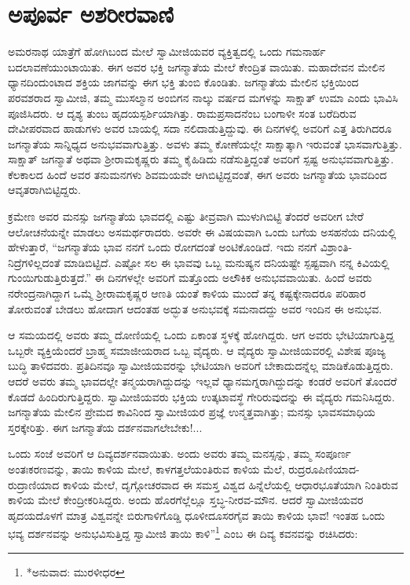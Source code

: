 
\chapter{ಅಪೂರ್ವ ಅಶರೀರವಾಣಿ}

\noindent

ಅಮರನಾಥ ಯಾತ್ರೆಗೆ ಹೋಗಿಬಂದ ಮೇಲೆ ಸ್ವಾಮೀಜಿಯವರ ವ್ಯಕ್ತಿತ್ವದಲ್ಲಿ ಒಂದು ಗಮನಾರ್ಹ ಬದಲಾವಣೆಯುಂಟಾಯಿತು. ಈಗ ಅವರ ಭಕ್ತಿ ಜಗನ್ಮಾತೆಯ ಮೇಲೆ ಕೇಂದ್ರಿತ ವಾಯಿತು. ಮಹಾದೇವನ ಮೇಲಿನ ಧ್ಯಾನದಿಂದುಂಟಾದ ಶಕ್ತಿಯ ಜಾಗವನ್ನು ಈಗ ಭಕ್ತಿ ತುಂಬಿ ಕೊಂಡಿತು. ಜಗನ್ಮಾತೆಯ ಮೇಲಿನ ಭಕ್ತಿಯಿಂದ ಪರವಶರಾದ ಸ್ವಾಮೀಜಿ, ತಮ್ಮ ಮುಸಲ್ಮಾನ ಅಂಬಿಗನ ನಾಲ್ಕು ವರ್ಷದ ಮಗಳನ್ನು ಸಾಕ್ಷಾತ್ ಉಮಾ ಎಂದು ಭಾವಿಸಿ ಪೂಜಿಸಿದರು. ಆ ದೃಶ್ಯ ತುಂಬ ಹೃದಯಸ್ಪರ್ಶಿಯಾಗಿತ್ತು. ರಾಮಪ್ರಸಾದನೆಂಬ ಬಂಗಾಳೀ ಸಂತ ಬರೆದಿರುವ ದೇವೀಪರವಾದ ಹಾಡುಗಳು ಅವರ ಬಾಯಲ್ಲಿ ಸದಾ ನಲಿದಾಡುತ್ತಿದ್ದುವು. ಈ ದಿನಗಳಲ್ಲಿ ಅವರಿಗೆ ಎತ್ತ ತಿರುಗಿದರೂ ಜಗನ್ಮಾತೆಯ ಸಾನ್ನಿಧ್ಯದ ಅನುಭವವಾಗುತ್ತಿತ್ತು. ಅವಳು ತಮ್ಮ ಕೋಣೆಯಲ್ಲೇ ಸಾಕ್ಷಾತ್ಕಾಗಿ ಇರುವಂತೆ ಭಾಸವಾಗುತ್ತಿತ್ತು. ಸಾಕ್ಷಾತ್ ಜಗನ್ಮಾತೆ ಅಥವಾ ಶ್ರೀರಾಮಕೃಷ್ಣರು ತಮ್ಮ ಕೈಹಿಡಿದು ನಡೆಸುತ್ತಿದ್ದಂತೆ ಅವರಿಗೆ ಸ್ಪಷ್ಟ ಅನುಭವವಾಗುತ್ತಿತ್ತು. ಕೆಲಕಾಲದ ಹಿಂದೆ ಅವರ ತನುಮನಗಳು ಶಿವಮಯವೇ ಆಗಿಬಿಟ್ಟಿದ್ದವಂತೆ, ಈಗ ಅವರು ಜಗನ್ಮಾತೆಯ ಭಾವದಿಂದ ಆವೃತರಾಗಿಬಿಟ್ಟಿದ್ದರು.

ಕ್ರಮೇಣ ಅವರ ಮನಸ್ಸು ಜಗನ್ಮಾತೆಯ ಭಾವದಲ್ಲಿ ಎಷ್ಟು ತೀವ್ರವಾಗಿ ಮುಳುಗಿಬಿಟ್ಟಿ ತೆಂದರೆ ಅವರೀಗ ಬೇರೆ ಆಲೋಚನೆಯನ್ನೇ ಮಾಡಲು ಅಸಮರ್ಥರಾದರು. ಅವರೇ ಈ ವಿಷಯವಾಗಿ ಒಂದು ಬಗೆಯ ಅಸಹನೆಯ ದನಿಯಲ್ಲಿ ಹೇಳುತ್ತಾರೆ, “ಜಗನ್ಮಾತೆಯ ಭಾವ ನನಗೆ ಒಂದು ರೋಗದಂತೆ ಅಂಟಿಕೊಂಡಿದೆ. ಇದು ನನಗೆ ವಿಶ್ರಾಂತಿ-ನಿದ್ರೆಗಳಿಲ್ಲದಂತೆ ಮಾಡಿಬಿಟ್ಟಿದೆ. ಎಷ್ಟೋ ಸಲ ಈ ಭಾವವು ಒಬ್ಬ ಮನುಷ್ಯನ ದನಿಯಷ್ಟೇ ಸ್ಪಷ್ಟವಾಗಿ ನನ್ನ ಕಿವಿಯಲ್ಲಿ ಗುಂಯಿಗುಡುತ್ತಿರುತ್ತದೆ.” ಈ ದಿನಗಳಲ್ಲೇ ಅವರಿಗೆ ಮತ್ತೊಂದು ಅಲೌಕಿಕ ಅನುಭವವಾಯಿತು. ಹಿಂದೆ ಅವರು ನರೇಂದ್ರನಾಗಿದ್ದಾಗ ಒಮ್ಮೆ ಶ್ರೀರಾಮಕೃಷ್ಣರ ಆಣತಿ ಯಂತೆ ಕಾಳಿಯ ಮುಂದೆ ತನ್ನ ಕಷ್ಟಕ್ಕೇನಾದರೂ ಪರಿಹಾರ ತೋರುವಂತೆ ಬೇಡಲು ಹೋದಾಗ ಆದಂತಹ ಅದ್ಭುತ ಅನುಭವಕ್ಕೆ ಸಮನಾದದ್ದು ಅವರ ಇಂದಿನ ಈ ಅನುಭವ.

ಆ ಸಮಯದಲ್ಲಿ ಅವರು ತಮ್ಮ ದೋಣಿಯಲ್ಲಿ ಒಂದು ಏಕಾಂತ ಸ್ಥಳಕ್ಕೆ ಹೋಗಿದ್ದರು. ಆಗ ಅವರು ಭೇಟಿಯಾಗುತ್ತಿದ್ದ ಒಬ್ಬರೇ ವ್ಯಕ್ತಿಯೆಂದರೆ ಬ್ರಾಹ್ಮ ಸಮಾಜೀಯರಾದ ಒಬ್ಬ ವೈದ್ಯರು. ಆ ವೈದ್ಯರು ಸ್ವಾಮೀಜಿಯವರಲ್ಲಿ ವಿಶೇಷ ಪೂಜ್ಯ ಬುದ್ಧಿ ತಾಳಿದವರು. ಪ್ರತಿದಿನವೂ ಸ್ವಾಮೀಜಿಯವರನ್ನು ಭೇಟಿಯಾಗಿ ಅವರಿಗೆ ಬೇಕಾದುದನ್ನೆಲ್ಲ ಮಾಡಿಕೊಡುತ್ತಿದ್ದರು. ಆದರೆ ಅವರು ತಮ್ಮ ಭಾವದಲ್ಲೇ ತನ್ಮಯರಾಗಿದ್ದುದನ್ನು ಇಲ್ಲವೆ ಧ್ಯಾನಮಗ್ನರಾಗಿದ್ದುದನ್ನು ಕಂಡರೆ ಅವರಿಗೆ ತೊಂದರೆ ಕೊಡದೆ ಹಿಂದಿರುಗುತ್ತಿದ್ದರು. ಸ್ವಾಮೀಜಿಯವರು ಭಕ್ತಿಯ ಉತ್ಕಟಾವಸ್ಥೆ ಗೇರಿರುವುದನ್ನು ಈ ವೈದ್ಯರು ಗಮನಿಸಿದ್ದರು. ಜಗನ್ಮಾತೆಯ ಮೇಲಿನ ಪ್ರೇಮದ ಕಾವಿನಿಂದ ಸ್ವಾಮೀಜಿಯರ ಪ್ರಜ್ಞೆ ಉನ್ಮತ್ತವಾಗಿತ್ತು; ಮನಸ್ಸು ಭಾವಸಮಾಧಿಯ ಸ್ತರಕ್ಕೇರಿತ್ತು. ಈಗ ಜಗನ್ಮಾತೆಯ ದರ್ಶನವಾಗಲೇಬೇಕು!... 

ಒಂದು ಸಂಜೆ ಅವರಿಗೆ ಆ ದಿವ್ಯದರ್ಶನವಾಯಿತು. ಅಂದು ಅವರು ತಮ್ಮ ಮನಸ್ಸನ್ನು, ತಮ್ಮ ಸಂಪೂರ್ಣ ಅಂತಃಕರಣವನ್ನು, ತಾಯಿ ಕಾಳಿಯ ಮೇಲೆ, ಕಾಳಗತ್ತಲೆಯಂತಿರುವ ಕಾಳಿಯ ಮೆಲೆ, ರುದ್ರರೂಪಿಣಿಯಾದ-ರುದ್ರಾಣಿಯಾದ ಕಾಳಿಯ ಮೇಲೆ, ದೃಗ್ಗೋಚರವಾದ ಈ ಸಮಸ್ತ ವಿಶ್ವದ ಹಿನ್ನೆಲೆಯಲ್ಲಿ ಆಧಾರಭೂತೆಯಾಗಿ ನಿಂತಿರುವ ಕಾಳಿಯ ಮೇಲೆ ಕೇಂದ್ರೀಕರಿಸಿದ್ದರು. ಅಂದು ಹೊರಗೆಲ್ಲೆಲ್ಲೂ ಸ್ತಬ್ಧ-ನೀರವ-ಮೌನ. ಆದರೆ ಸ್ವಾಮೀಜಿಯವರ ಹೃದಯದೊಳಗೆ ಮಾತ್ರ ವಿಶ್ವವನ್ನೇ ಬಿರುಗಾಳಿಗೊಡ್ಡಿ ಧೂಳೀದೂಸರಗೈವ ತಾಯಿ ಕಾಳಿಯ ಭಾವ! ಇಂತಹ ಒಂದು ಭವ್ಯ ದರ್ಶನವನ್ನು ಅನುಭವಿಸುತ್ತಿದ್ದ ಸ್ವಾಮೀಜಿ ತಾಯಿ ಕಾಳಿ”\footnote{*ಅನುವಾದ: ಮುರಳೀಧರ} ಎಂಬ ಈ ದಿವ್ಯ ಕವನವನ್ನು ರಚಿಸಿದರು:

